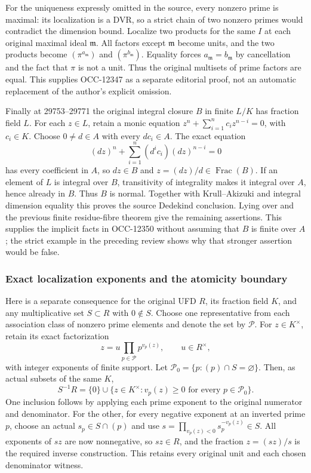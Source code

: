 For the uniqueness expressly omitted in the source, every nonzero prime is maximal: its localization is a DVR, so a strict chain of two nonzero primes would contradict the dimension bound. Localize two products for the same \(I\) at each original maximal ideal \(\mathfrak m\). All factors except \(\mathfrak m\) become units, and the two products become \((\pi^{a_{\mathfrak m}})\) and \((\pi^{b_{\mathfrak m}})\). Equality forces \(a_{\mathfrak m}=b_{\mathfrak m}\) by cancellation and the fact that \(\pi\) is not a unit. Thus the original multisets of prime factors are equal. This supplies OCC-12347 as a separate editorial proof, not an automatic replacement of the author's explicit omission.

Finally at 29753--29771 the original integral closure \(B\) in finite \(L/K\) has fraction field \(L\). For each \(z\in L\), retain a monic equation \(z^n+\sum_{i=1}^n c_i z^{n-i}=0\), with \(c_i\in K\). Choose \(0\ne d\in A\) with every \(dc_i\in A\). The exact equation \[
 (dz)^n+\sum_{i=1}^n(d^i c_i)(dz)^{n-i}=0
\] has every coefficient in \(A\), so \(dz\in B\) and \(z=(dz)/d\in\operatorname{Frac}(B)\). If an element of \(L\) is integral over \(B\), transitivity of integrality makes it integral over \(A\), hence already in \(B\). Thus \(B\) is normal. Together with Krull--Akizuki and integral dimension equality this proves the source Dedekind conclusion. Lying over and the previous finite residue-fibre theorem give the remaining assertions. This supplies the implicit facts in OCC-12350 without assuming that \(B\) is finite over \(A\); the strict example in the preceding review shows why that stronger assertion would be false.

\subsubsection{Exact localization exponents and the atomicity boundary}\label{algebra-proof-029-exact-localization-exponents-and-the-atomicity-boundary}

Here is a separate consequence for the original UFD \(R\), its fraction field \(K\), and any multiplicative set \(S\subset R\) with \(0\notin S\). Choose one representative from each association class of nonzero prime elements and denote the set by \(\mathcal P\). For \(z\in K^\times\), retain its exact factorization \[
 z=u\prod_{p\in\mathcal P}p^{v_p(z)},\qquad u\in R^\times,
\] with integer exponents of finite support. Let \(\mathcal P_0=\{p:(p)\cap S=\varnothing\}\). Then, as actual subsets of the same \(K\), \[
 S^{-1}R=\{0\}\cup
 \{z\in K^\times:v_p(z)\ge0\text{ for every }p\in\mathcal P_0\}.
\] One inclusion follows by applying each prime exponent to the original numerator and denominator. For the other, for every negative exponent at an inverted prime \(p\), choose an actual \(s_p\in S\cap(p)\) and use \(s=\prod_{v_p(z)<0}s_p^{-v_p(z)}\in S\). All exponents of \(sz\) are now nonnegative, so \(sz\in R\), and the fraction \(z=(sz)/s\) is the required inverse construction. This retains every original unit and each chosen denominator witness.

